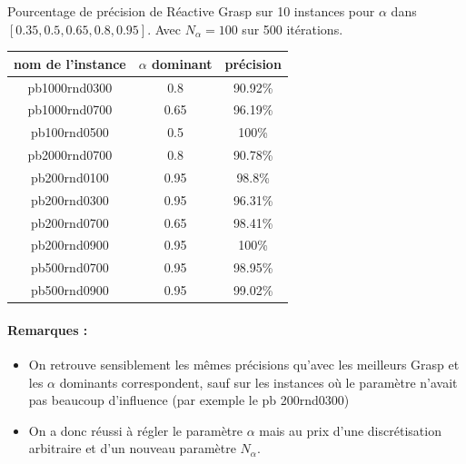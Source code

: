 Pourcentage de précision de Réactive Grasp sur 10 instances pour $\alpha$ dans $[0.35,0.5,0.65,0.8,0.95]$. Avec $N_{\alpha} = 100$ sur 500 itérations.
\begin{center}
    \begin{tabular}{|c|c|c|}  
    \hline
    nom de l'instance & $\alpha$ dominant & précision \\
     \hline
     pb1000rnd0300 & 0.8 & 90.92\% \\
     \hline
     pb1000rnd0700 & 0.65 & 96.19\%\\
     \hline
     pb100rnd0500 & 0.5 & 100\%\\
     \hline
     pb2000rnd0700 & 0.8 & 90.78\%\\
     \hline
     pb200rnd0100 & 0.95 & 98.8\%\\
     \hline
     pb200rnd0300 & 0.95 & 96.31\%\\
     \hline
     pb200rnd0700 & 0.65 & 98.41\%\\
     \hline
     pb200rnd0900 & 0.95 & 100\%\\
     \hline 
     pb500rnd0700 & 0.95 & 98.95\%\\
     \hline 
     pb500rnd0900 & 0.95 & 99.02\%\\
     \hline
    \end{tabular}
\end{center}

%


\paragraph{Remarques : }
\begin{itemize}
\item On retrouve sensiblement les mêmes précisions qu'avec les meilleurs Grasp et les $\alpha$ dominants correspondent, sauf sur les instances où le paramètre n'avait pas beaucoup d'influence (par exemple le pb 200rnd0300)
\item On a donc réussi à régler le paramètre $\alpha$ mais au prix d'une discrétisation arbitraire et d'un nouveau paramètre $N_{\alpha}$.
\end{itemize}


\vspace{5mm}
\noindent
{}
\vspace{2mm}

